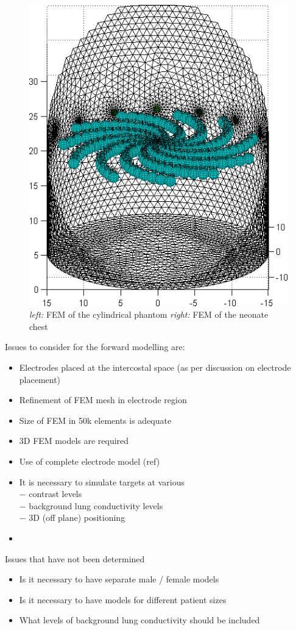 \documentclass[12pt]{iopart}
\begin{document}
\begin{figure}[bhtp]
\begin{center}
  \includegraphics[width= 0.4 \textwidth]
         {../../tutorial/GREIT-evaluation/simulation_3d_test02a.png}

\caption{ \label{fig:fm2}
{\em left:} FEM of the cylindrical phantom
{\em right:} FEM of the neonate chest 
}
\end{center}
\end{figure}

Issues to consider for the forward modelling are:
\begin{itemize}
\item
Electrodes placed at the intercostal space
(as per discussion on electrode placement)
\item
Refinement of FEM mesh in electrode region
\item
Size of FEM in 50k elements is adequate
\item
3D FEM models are required
\item
Use of complete electrode model (ref)
\item
It is necessary to simulate targets at various
\\ $-$ contrast levels
\\ $-$ background lung conductivity levels
\\ $-$ 3D (off plane) positioning
\item
\end{itemize}

Issues that have not been determined
\begin{itemize}
\item
Is it necessary to have separate male / female models
\item
Is it necessary to have models for different patient sizes
\item
What levels of background lung conductivity should be included
\end{itemize}
\end{document}

